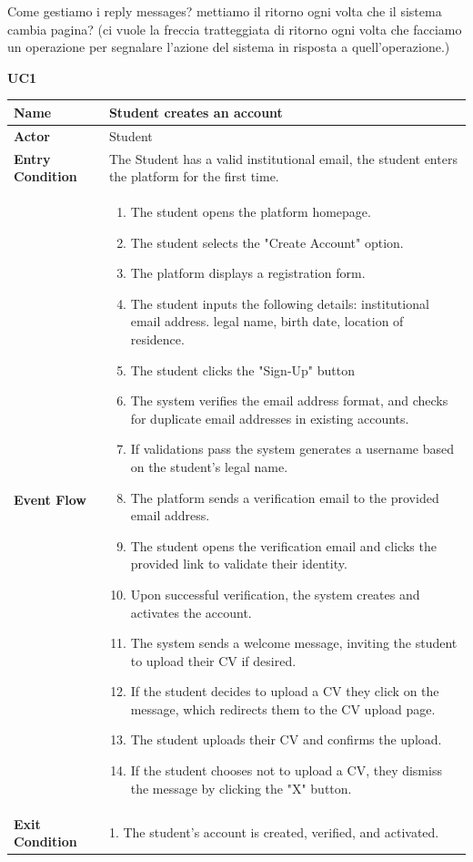 Come gestiamo i reply messages? mettiamo il ritorno ogni volta che il sistema cambia pagina? (ci vuole la freccia tratteggiata di ritorno ogni volta che facciamo un operazione per segnalare l'azione del sistema in risposta a quell'operazione.)

\textbf{UC1}

\begin{longtable}{|p{}|p{}|}
\hline
\textbf{Name} & Student creates an account \\
\hline
\textbf{Actor} & Student\\
\hline
\textbf{Entry Condition} & The Student has a valid institutional email, the student enters the platform for the first time.\\
\hline
\textbf{Event Flow} & 
\begin{enumerate}
    \item The student opens the platform homepage.
    \item The student selects the "Create Account" option.
    \item The platform displays a registration form.
    \item The student inputs the following details:	institutional email address. legal name, birth date, location of residence.
    \item The student clicks the "Sign-Up" button
    \item The system verifies the email address format, and checks for duplicate email addresses in existing accounts.
    \item  If validations pass the system generates a username based on the student’s legal name.
    \item The platform sends a verification email to the provided email address.
    \item The student opens the verification email and clicks the provided link to validate their identity.
    \item Upon successful verification, the system creates and activates the account.
    \item The system sends a welcome message, inviting the student to upload their CV if desired.
    \item  If the student decides to upload a CV they click on the message, which redirects them to the CV upload page.
    \item The student uploads their CV and confirms the upload.
    \item If the student chooses not to upload a CV, they dismiss the message by clicking the "X" button.
\end{enumerate} \\
\hline
\textbf{Exit Condition} & 
1. The student’s account is created, verified, and activated.


\end{longtable}
